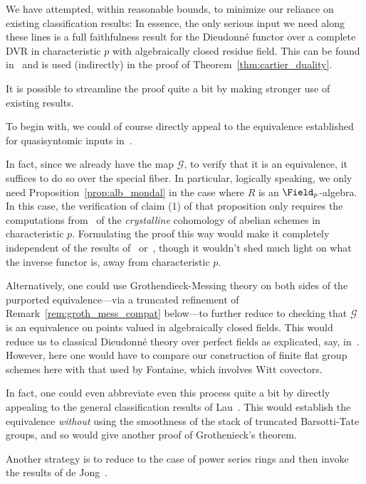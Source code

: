 \documentclass[10pt]{amsart}
\begin{document}
\begin{remark}
\label{rem:mondal_not_needed}
We have attempted, within reasonable bounds, to minimize our reliance on existing classification results: In essence, the only serious input we need along these lines is a full faithfulness result for the Dieudonn\'e functor over a complete DVR in characteristic $p$ with algebraically closed residue field. This can be found in~\cite[\S 4.1]{Berthelot1990-gp} and is used (indirectly) in the proof of Theorem~\ref{thm:cartier_duality}.

It is possible to streamline the proof quite a bit by making stronger use of existing results. 

To begin with, we could of course directly appeal to the equivalence established for quasisyntomic inputs in~\cite{MR4530092}.

In fact, since we already have the map $\mathcal{G}$, to verify that it is an equivalence, it suffices to do so over the special fiber. In particular, logically speaking, we only need Proposition~\ref{prop:alb_mondal} in the case where $R$ is an $\Field_p$-algebra. In this case, the verification of claim (1) of that proposition only requires the computations from~\cite{bbm:cris_ii} of the \emph{crystalline} cohomology of abelian schemes in characteristic $p$. Formulating the proof this way would make it completely independent of the results of~\cite{MR4530092} or~\cite{Mondal2024-cy}, though it wouldn't shed much light on what the inverse functor is, away from characteristic $p$.

Alternatively, one could use Grothendieck-Messing theory on both sides of the purported equivalence---via a truncated refinement of Remark~\ref{rem:groth_mess_compat} below---to further reduce to checking that $\mathcal{G}$ is an equivalence on points valued in algebraically closed fields. This would reduce us to classical Dieudonn\'e theory over perfect fields as explicated, say, in~\cite{MR0498610}. However, here one would have to compare our construction of finite flat group schemes here with that used by Fontaine, which involves Witt covectors. 

In fact, one could even abbreviate even this process quite a bit by directly appealing to the general classification results of Lau~\cite{lau2018divided}. This would establish the equivalence \emph{without} using the smoothness of the stack of truncated Barsotti-Tate groups, and so would give another proof of Grothenieck's theorem.

Another strategy is to reduce to the case of power series rings and then invoke the results of de Jong~\cite{dejong:formal_rigid}.
\end{remark} 
\end{document}

